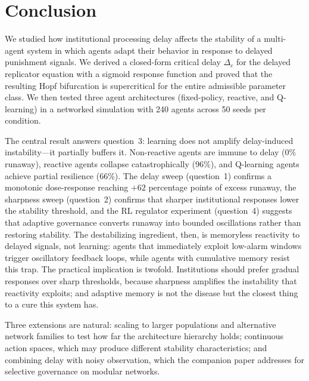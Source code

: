 \section{Conclusion}

We studied how institutional processing delay affects the stability of a multi-agent system in which agents adapt their behavior in response to delayed punishment signals. We derived a closed-form critical delay $\Delta_c$ for the delayed replicator equation with a sigmoid response function and proved that the resulting Hopf bifurcation is supercritical for the entire admissible parameter class. We then tested three agent architectures (fixed-policy, reactive, and Q-learning) in a networked simulation with 240 agents across 50 seeds per condition.

The central result answers question~3: learning does not amplify delay-induced instability---it partially buffers it. Non-reactive agents are immune to delay (0\% runaway), reactive agents collapse catastrophically (96\%), and Q-learning agents achieve partial resilience (66\%). The delay sweep (question~1) confirms a monotonic dose-response reaching $+62$ percentage points of excess runaway, the sharpness sweep (question~2) confirms that sharper institutional responses lower the stability threshold, and the RL regulator experiment (question~4) suggests that adaptive governance converts runaway into bounded oscillations rather than restoring stability. The destabilizing ingredient, then, is memoryless reactivity to delayed signals, not learning: agents that immediately exploit low-alarm windows trigger oscillatory feedback loops, while agents with cumulative memory resist this trap. The practical implication is twofold. Institutions should prefer gradual responses over sharp thresholds, because sharpness amplifies the instability that reactivity exploits; and adaptive memory is not the disease but the closest thing to a cure this system has.

Three extensions are natural: scaling to larger populations and alternative network families to test how far the architecture hierarchy holds; continuous action spaces, which may produce different stability characteristics; and combining delay with noisy observation, which the companion paper addresses for selective governance on modular networks.
